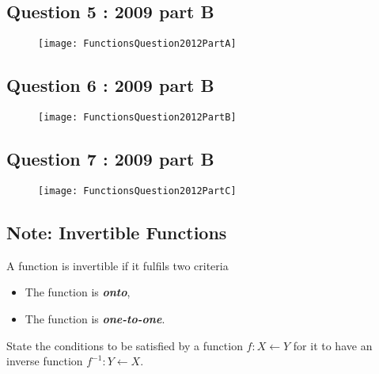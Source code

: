 \newpage
\subsection*{Question 5 : 2009 part B}

\begin{figure}[h!]
	\centering
	\texttt{[image: FunctionsQuestion2012PartA]}
	
\end{figure}


\newpage
\subsection*{Question 6 : 2009 part B}
\begin{figure}[h!]
	\centering
	\texttt{[image: FunctionsQuestion2012PartB]}
	
\end{figure}


\newpage
\subsection*{Question 7 : 2009 part B}
\begin{figure}[h!]
	\centering
	\texttt{[image: FunctionsQuestion2012PartC]}
	
\end{figure}

\newpage


\newpage

\subsection*{Note: Invertible Functions}
A function is invertible if it fulfils two criteria
\begin{itemize}
	\item The function is \textbf{\textit{onto}},
	\item The function is \textbf{\textit{one-to-one}}.
\end{itemize}
\begin{framed}
State the conditions to be satisfied by a function
$f : X \leftarrow Y$ for it to have an inverse function
$f^{-1} : Y \leftarrow X$.
\end{framed}

